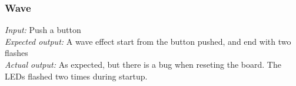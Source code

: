 \subsubsection{Wave}

\emph{Input: } Push a button  \\
\emph{Expected output: } A wave effect start from the button pushed, and end with two flashes  \\
\emph{Actual output: }  As expected, but there is a bug when reseting the board. The LEDs flashed two times during startup. \\



	



	
		
%
	
	

